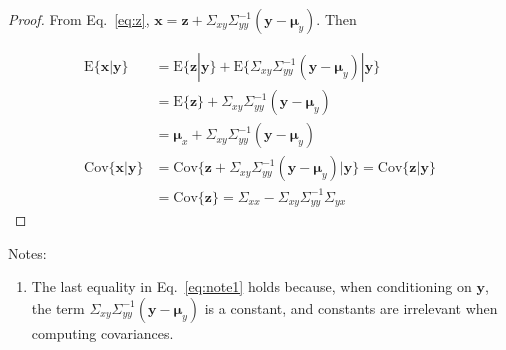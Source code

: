 \begin{proof}
    From Eq.~\ref{eq:z},
    $\mathbf{x}=\mathbf{z}+\Sigma_{xy}\Sigma_{yy}^{-1}(\mathbf{y}-\boldsymbol{\mu}_y)$.
    Then

    \begin{align}
        \text{E}\{\mathbf{x}|\mathbf{y}\}&=\text{E}\{\mathbf{z}|\mathbf{y}\}+\text{E}\{\Sigma_{xy}\Sigma_{yy}^{-1}(\mathbf{y}-\boldsymbol{\mu}_y)|\mathbf{y}\}\nonumber\\
                                         &=\text{E}\{\mathbf{z}\}+\Sigma_{xy}\Sigma_{yy}^{-1}(\mathbf{y}-\boldsymbol{\mu}_y)\nonumber\\
                                         &=\boldsymbol{\mu}_x+\Sigma_{xy}\Sigma_{yy}^{-1}(\mathbf{y}-\boldsymbol{\mu}_y)\nonumber\\
        \text{Cov}\{\mathbf{x}|\mathbf{y}\}&=\text{Cov}\{\mathbf{z}+\Sigma_{xy}\Sigma_{yy}^{-1}(\mathbf{y}-\boldsymbol{\mu}_y)|\mathbf{y}\}=\text{Cov}\{\mathbf{z}|\mathbf{y}\}\label{eq:note1}\\
                                           &=\text{Cov}\{\mathbf{z}\}=\Sigma_{xx}-\Sigma_{xy}\Sigma_{yy}^{-1}\Sigma_{yx}\nonumber
    \end{align}

\end{proof}

Notes:

\begin{enumerate}

    \item The last equality in Eq.~\ref{eq:note1} holds because, when
        conditioning on $\mathbf{y}$, the term
        $\Sigma_{xy}\Sigma_{yy}^{-1}(\mathbf{y}-\boldsymbol{\mu}_y)$ is a
        constant, and constants are irrelevant when computing covariances.

\end{enumerate}
